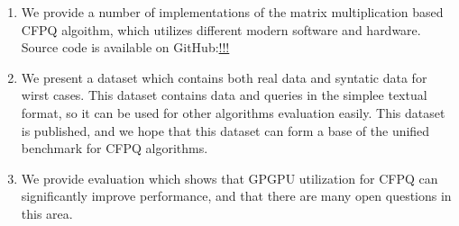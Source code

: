 \begin{enumerate}
\item We provide a number of implementations of the matrix multiplication based CFPQ algoithm, which utilizes different modern software and hardware.
Source code is available on GitHub:\url{!!!}
\item We present a dataset which contains both real data and syntatic data for wirst cases.
This dataset contains data and queries in the simplee textual format, so it can be used for other algorithms evaluation easily.
This dataset is published, and we hope that this dataset can form a base of the unified benchmark for CFPQ algorithms.
\item We provide evaluation which shows that GPGPU utilization for CFPQ can significantly improve performance, and that there are many open questions in this area.
\end{enumerate}
